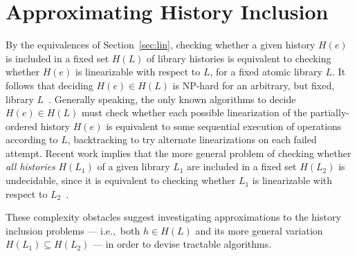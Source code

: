 \section{Approximating History Inclusion}
\label{sec:counting}

By the equivalences of Section~\ref{sec:lin}, checking whether a given history
$H(e)$ is included in a fixed set $H(L)$ of library histories is equivalent to
checking whether $H(e)$ is linearizable with respect to $L$, for a fixed atomic
library $L$. It follows that deciding $H(e) \in H(L)$ is NP-hard for an
arbitrary, but fixed, library $L$~\cite{journals/siamcomp/GibbonsK97}.
Generally speaking, the only known algorithms to decide $H(e) \in H(L)$ must
check whether each possible linearization of the partially-ordered history
$H(e)$ is equivalent to some sequential execution of operations according to
$L$, backtracking to try alternate linearizations on each failed attempt.
Recent work implies that the more general problem of checking whether \emph{all
histories} $H(L_1)$ of a given library $L_1$ are included in a fixed set
$H(L_2)$ is undecidable, since it is equivalent to checking whether $L_1$ is
linearizable with respect to $L_2$~\cite{conf/esop/BouajjaniEEH13}.

These complexity obstacles suggest investigating approximations to the history
inclusion problems --- i.e.,~both $h \in H(L)$ and its more general variation
$H(L_1) \subseteq H(L_2)$ --- in order to devise tractable algorithms.

